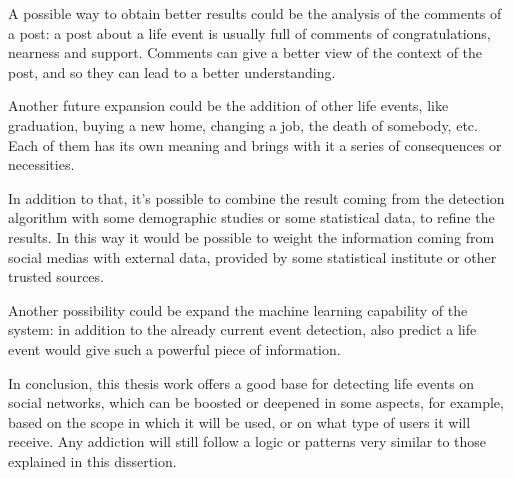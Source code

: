 A possible way to obtain better results could be the analysis of the comments of a post: a post about a life event is usually full of comments of congratulations, nearness and support. Comments can give a better view of the context of the post, and so they can lead to a better understanding.

Another future expansion could be the addition of other life events, like graduation, buying a new home, changing a job, the death of somebody, etc. Each of them has its own meaning and brings with it a series of consequences or necessities.

In addition to that, it's possible to combine the result coming from the detection algorithm with some demographic studies or some statistical data, to refine the results. In this way it would be possible to weight the information coming from social medias with external data, provided by some statistical institute or other trusted sources.

Another possibility could be expand the machine learning capability of the system: in addition to the already current event detection, also predict a life event would give such a powerful piece of information.

In conclusion, this thesis work offers a good base for detecting life events on social networks, which can be boosted or deepened in some aspects, for example, based on the scope in which it will be used, or on what type of users it will receive. Any addiction will still follow a logic or patterns very similar to those explained in this dissertion.